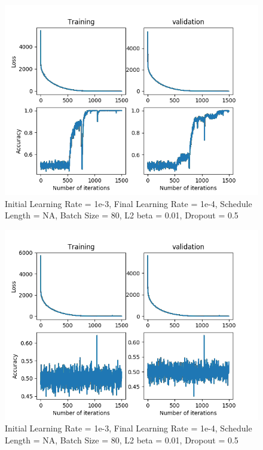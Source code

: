 \documentclass[12pt,reqno]{amsart}
\numberwithin{equation}{section}
\begin{document}
\begin{enumerate}
\begin{figure}[H]
\centering
\includegraphics[scale=0.6]{Commit-test-5}
\caption{Initial Learning Rate = 1e-3, Final Learning Rate = 1e-4, Schedule Length = NA, Batch Size = 80, L2 beta = 0.01, Dropout = 0.5}
\end{figure}

\begin{figure}[H]
\centering
\includegraphics[scale=0.6]{Commit-test-6}
\caption{Initial Learning Rate = 1e-3, Final Learning Rate = 1e-4, Schedule Length = NA, Batch Size = 80, L2 beta = 0.01, Dropout = 0.5}
\end{figure}


\end{enumerate}
\end{document}
